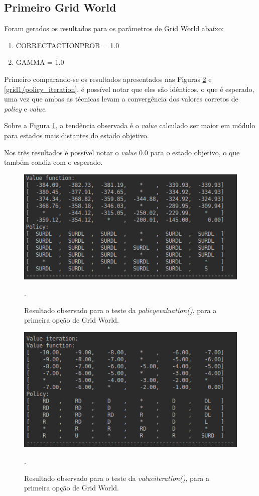\documentclass[conference]{IEEEtran}
\begin{document}
\subsection{Primeiro Grid World}
Foram gerados os resultados para os parâmetros de Grid World abaixo:

\begin{enumerate}
\item CORRECT\underline{\space}ACTION\underline{\space}PROB = 1.0

\item GAMMA = 1.0
\end{enumerate}

Primeiro comparando-se os resultados apresentados nas Figuras \ref{grid1/value_iteration} e \ref{grid1/policy_iteration}, é possível notar que eles são idênticos, o que é esperado, uma vez que ambas as técnicas levam a convergência dos valores corretos de \textit{policy} e \textit{value}.

Sobre a Figura \ref{grid1/policy_evaluation}, a tendência observada é o \textit{value} calculado ser maior em módulo para estados mais distantes do estado objetivo.

Nos três resultados é possível notar o \textit{value} 0.0 para o estado objetivo, o que também condiz com o esperado. 

\begin{figure}[htbp]
\centering
\centerline{\includegraphics[scale=0.5]{imagens/grid1/policy_evaluation.png}}
\caption{Resultado observado para o teste da \textit{policy\underline{\space}evaluation()}, para a primeira opção de Grid World.}.
\label{grid1/policy_evaluation}
\end{figure}

\begin{figure}[htbp]
\centering
\centerline{\includegraphics[scale=0.5]{imagens/grid1/value_iteration.png}}
\caption{Resultado observado para o teste da \textit{value\underline{\space}iteration()}, para a primeira opção de Grid World.}.
\label{grid1/value_iteration}
\end{figure} 
\end{document}
